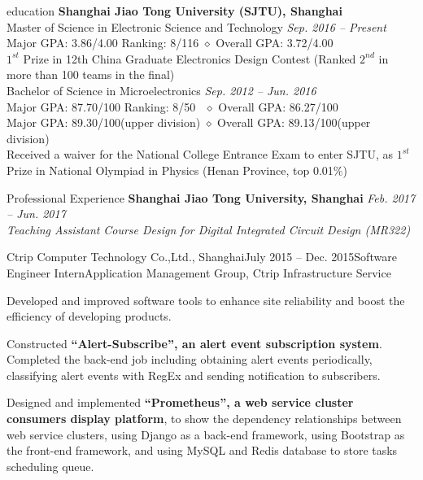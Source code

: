 \documentclass{resume_new} %
\begin{document}

\begin{rSection}{education}
\textbf{Shanghai Jiao Tong University (SJTU), Shanghai}
\\Master of Science in Electronic Science and Technology \hfill \emph{Sep. 2016 -- Present}
\\\bm{$\diamond$} Major GPA: 3.86/4.00 \qquad Ranking: 8/116 \qquad $\diamond$ Overall GPA: 3.72/4.00
\\\bm{$\diamond$} $1^{st}$ Prize in 12th China Graduate Electronics Design Contest (Ranked $2^{nd}$ in more than 100 teams in the final)
\\Bachelor of Science in Microelectronics \hfill \emph{Sep. 2012 -- Jun. 2016}
\\\bm{$\diamond$} Major GPA: 87.70/100 \qquad Ranking: 8/50 \qquad \ $\diamond$ Overall GPA: 86.27/100
\\\bm{$\diamond$} Major GPA: 89.30/100(upper division) \qquad \qquad$\diamond$ Overall GPA: 89.13/100(upper division)
\\\bm{$\diamond$} Received a waiver for the National College Entrance Exam to enter SJTU, as $1^{st}$ Prize in National Olympiad in Physics (Henan Province, top 0.01$\%$)
\end{rSection}

\begin{rSection}{Professional Experience}
\textbf{Shanghai Jiao Tong University, Shanghai} \hfill \emph{Feb. 2017 -- Jun. 2017}
\\\emph{Teaching Assistant} \hfill \emph {Course Design for Digital Integrated Circuit Design (MR322) }\\
\begin{rSubsection}{Ctrip Computer Technology Co.,Ltd., Shanghai}{July 2015 -- Dec. 2015}{Software Engineer Intern}{Application Management Group, Ctrip Infrastructure Service}
\item Developed and improved software tools to enhance site reliability and boost the efficiency of developing  products.
\item Constructed \textbf{``Alert-Subscribe'', an alert event subscription system}. Completed the back-end job including obtaining alert events periodically, classifying alert events with RegEx and sending notification to subscribers.
\item Designed and implemented \textbf{``Prometheus'', a web service cluster consumers display platform}, to show the dependency relationships between web service clusters, using Django as a back-end framework, using Bootstrap as the front-end framework, and using MySQL and Redis database to store tasks scheduling queue.
\end{rSubsection}
\end{rSection}
\end{document}
